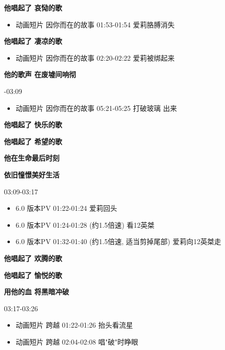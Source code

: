 \documentclass[a4paper]{article}
\begin{document}

\textbf{他唱起了 哀恸的歌}

\begin{itemize}
    \item 动画短片 因你而在的故事 01:53-01:54 爱莉胳膊消失
\end{itemize}

\textbf{他唱起了 凄凉的歌}

\begin{itemize}
    \item 动画短片 因你而在的故事 02:20-02:22 爱莉被绑起来
\end{itemize}

\textbf{他的歌声 在废墟间响彻}

-03:09

\begin{itemize}
    \item 动画短片 因你而在的故事 05:21-05:25 打破玻璃 出来
\end{itemize}

\textbf{他唱起了 快乐的歌}

\textbf{他唱起了 希望的歌}

\textbf{他在生命最后时刻}

\textbf{依旧憧憬美好生活}

03:09-03:17

\begin{itemize}
    \item 6.0 版本PV 01:22-01:24 爱莉回头
    \item 6.0 版本PV 01:24-01:28 (约1.5倍速) 看12英桀
    \item 6.0 版本PV 01:32-01:40 (约1.5倍速, 适当剪掉尾部) 爱莉向12英桀走
\end{itemize}

\textbf{他唱起了 欢腾的歌}

\textbf{他唱起了 愉悦的歌}

\textbf{用他的血 将黑暗冲破}

03:17-03:26

\begin{itemize}
    \item 动画短片 跨越 01:22-01:26 抬头看流星
    \item 动画短片 跨越 02:04-02:08 唱"破"时睁眼
\end{itemize}
\end{document}
